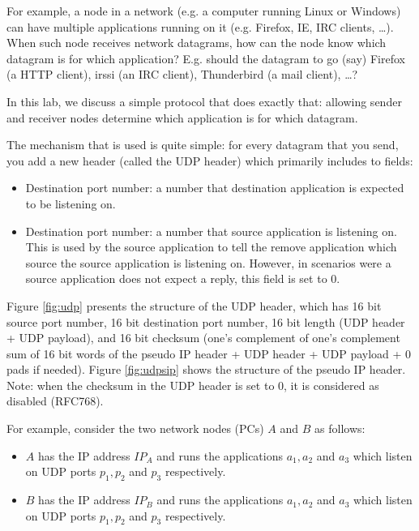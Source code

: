 \documentclass[pdftex,12pt,a4paper]{article}
\begin{document}
        For example, a node in a network (e.g. a computer running Linux or
        Windows) can have multiple applications running on it (e.g. Firefox,
        IE, IRC clients, \ldots). When such node receives network datagrams,
        how can the node know which datagram is for which application? E.g.
        should the datagram to go (say) Firefox (a HTTP client), irssi (an IRC client), Thunderbird
        (a mail client), \ldots?

        In this lab, we discuss a simple protocol that does exactly that:
        allowing sender and receiver nodes determine which application is for
        which datagram.

        The mechanism that is used is quite simple: for every datagram that you
        send, you add a new header (called the UDP header) which primarily
        includes to fields:
        \begin{itemize}
            \item Destination port number: a number that destination
                application is expected to be listening on. 
            \item Destination port number: a number that source 
                application is listening on. This is used by the source
                application to tell the remove application which source the
                source application is listening on. However, in scenarios were a
                source application does not expect a reply, this field is set
                to 0.
        \end{itemize}

        Figure \ref{fig:udp} presents the structure of the UDP header, which
        has 16 bit source port number, 16 bit destination port number, 16 bit
        length (UDP header + UDP payload), and 16 bit checksum (one's
        complement of one's complement sum of 16 bit words of the pseudo IP
        header + UDP header + UDP payload + 0 pads if needed). Figure
        \ref{fig:udpsip} shows the structure of the pseudo IP header. Note:
        when the checksum in the UDP header is set to 0, it is considered as
        disabled (RFC768).

        For example, consider the two network nodes (PCs) $A$ and $B$ as
        follows:
        \begin{itemize}
            \item $A$ has the IP address $IP_A$ and runs the
                applications $a_{1}, a_{2}$ and $a_{3}$ which listen
                on UDP ports $p_1, p_2$ and $p_3$ respectively.
            \item $B$ has the IP address $IP_B$ and runs the
                applications $a_{1}, a_{2}$ and $a_{3}$ which listen
                on UDP ports $p_1, p_2$ and $p_3$ respectively.
        \end{itemize}
\end{document}
